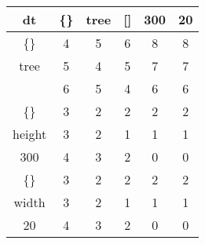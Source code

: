 \begin{tabular}{|c|c|c|c|c|c|}
    \hline
    dt& \{\} & tree & [\hspace{0.2cm}] & 300 & 20 \\ \hline
    \{\} & 4 & 5 & 6 & 8 & 8 \\ \hline
    tree & 5 & 4 & 5 & 7 & 7 \\ \hline
    [\hspace{0.2cm}] & 6 & 5 & 4 & 6 & 6 \\ \hline
    \{\} & 3 & 2 & 2 & 2 & 2 \\ \hline
    height & 3 & 2 & 1 & 1 & 1 \\ \hline
    300 & 4 & 3 & 2 & 0 & 0 \\ \hline
    \{\} & 3 & 2 & 2 & 2 & 2 \\ \hline
    width & 3 & 2 & 1 & 1 & 1 \\ \hline
    20 & 4 & 3 & 2 & 0 & 0 \\ \hline
\end{tabular}